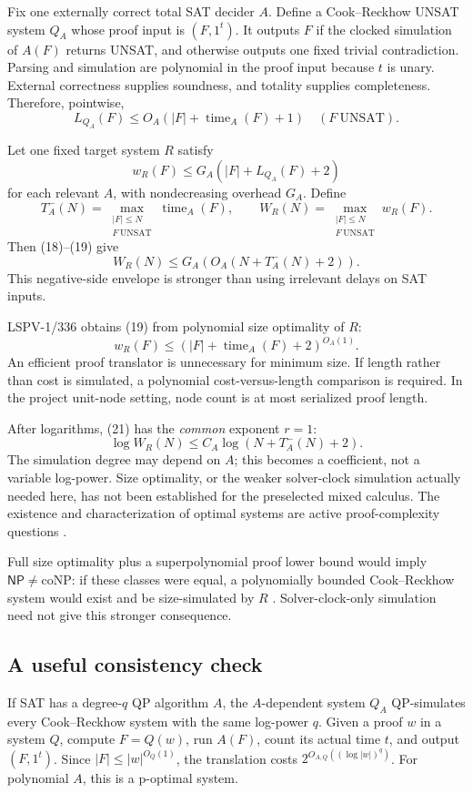 \documentclass[11pt]{article}
\newcommand{\NP}{\mathsf{NP}}
\begin{document}
Fix one externally correct total SAT decider $A$. Define a Cook--Reckhow
UNSAT system $Q_A$ whose proof input is $(F,1^t)$. It outputs $F$ if
the clocked simulation of $A(F)$ returns UNSAT, and otherwise outputs
one fixed trivial contradiction. Parsing and simulation are polynomial
in the proof input because $t$ is unary. External correctness supplies
soundness, and totality supplies completeness. Therefore, pointwise,
\[
 L_{Q_A}(F)\le O_A(|F|+\operatorname{time}_A(F)+1)
 \quad(F\ \mathrm{UNSAT}).
 \tag{18}
\]

Let one fixed target system $R$ satisfy
\[
 w_R(F)\le G_A(|F|+L_{Q_A}(F)+2)
 \tag{19}
\]
for each relevant $A$, with nondecreasing overhead $G_A$. Define
\[
 T_A^-(N)=
 \max_{\substack{|F|\le N\\F\ \mathrm{UNSAT}}}
 \operatorname{time}_A(F),\qquad
 W_R(N)=\max_{\substack{|F|\le N\\F\ \mathrm{UNSAT}}}w_R(F).
\]
Then (18)--(19) give
\[
 \boxed{W_R(N)\le G_A(O_A(N+T_A^-(N)+2)).}
 \tag{20}
\]
This negative-side envelope is stronger than using irrelevant delays on
SAT inputs.

LSPV-1/336 \cite{clock336} obtains (19) from polynomial size optimality of $R$:
\[
 w_R(F)\le(|F|+\operatorname{time}_A(F)+2)^{O_A(1)}.
 \tag{21}
\]
An efficient proof translator is unnecessary for minimum size.
If length rather than cost is simulated, a polynomial cost-versus-length
comparison is required. In the project unit-node setting, node count is
at most serialized proof length.

After logarithms, (21) has the \emph{common} exponent $r=1$:
\[
 \log W_R(N)\le C_A\log(N+T_A^-(N)+2).
 \tag{22}
\]
The simulation degree may depend on $A$; this becomes a coefficient, not
a variable log-power. Size optimality, or the weaker solver-clock
simulation actually needed here, has not been established for the
preselected mixed calculus. The existence and characterization of optimal
systems are active proof-complexity questions \cite{egidy2026}.

Full size optimality plus a superpolynomial proof lower bound would imply
$\NP\ne\mathrm{coNP}$: if these classes were equal, a polynomially bounded
Cook--Reckhow system would exist and be size-simulated by $R$
\cite{cookreckhow1979}. Solver-clock-only simulation need not give this
stronger consequence.

\subsection{A useful consistency check}
If SAT has a degree-$q$ QP algorithm $A$, the $A$-dependent system $Q_A$
QP-simulates every Cook--Reckhow system with the same log-power $q$.
Given a proof $w$ in a system $Q$, compute $F=Q(w)$, run $A(F)$, count its
actual time $t$, and output $(F,1^t)$. Since $|F|\le|w|^{O_Q(1)}$,
the translation costs $2^{O_{A,Q}((\log|w|)^q)}$.
For polynomial $A$, this is a p-optimal system.
\end{document}
